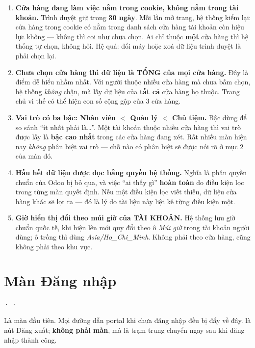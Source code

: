 \begin{enumerate}[leftmargin=*]
  \item \textbf{Cửa hàng đang làm việc nằm trong cookie, không nằm trong tài khoản.} Trình duyệt
        giữ  trong \textbf{30 ngày}. Mỗi lần mở trang, hệ thống
        kiểm lại: cửa hàng trong cookie có nằm trong danh sách cửa hàng tài khoản còn hiệu lực
        không --- không thì coi như chưa chọn. Ai chỉ thuộc \textbf{một} cửa hàng thì hệ thống
        tự chọn, không hỏi. Hệ quả: đổi máy hoặc xoá dữ liệu trình duyệt là phải chọn lại.
  \item \textbf{Chưa chọn cửa hàng thì dữ liệu là TỔNG của mọi cửa hàng.} Đây là điểm dễ hiểu
        nhầm nhất. Với người thuộc nhiều cửa hàng mà chưa bấm chọn, hệ thống \emph{không} chặn,
        mà lấy dữ liệu của \textbf{tất cả} cửa hàng họ thuộc. Trang chủ vì thế có thể hiện con
        số cộng gộp của 3 cửa hàng.
  \item \textbf{Vai trò có ba bậc: Nhân viên $<$ Quản lý $<$ Chủ tiệm.} Bậc dùng để so sánh
        ``ít nhất phải là\ldots''. Một tài khoản thuộc nhiều cửa hàng thì vai trò được lấy là
        \textbf{bậc cao nhất} trong các cửa hàng đang xét. Rất nhiều màn hiện nay \emph{không}
        phân biệt vai trò --- chỗ nào có phân biệt sẽ được nói rõ ở mục 2 của màn đó.
  \item \textbf{Hầu hết dữ liệu được đọc bằng quyền hệ thống.} Nghĩa là phân quyền chuẩn của
        Odoo bị bỏ qua, và việc ``ai thấy gì'' \textbf{hoàn toàn} do điều kiện lọc trong từng
        màn quyết định. Nếu một điều kiện lọc viết thiếu, dữ liệu cửa hàng khác sẽ lọt ra --- đó
        là lý do tài liệu này liệt kê từng điều kiện một.
  \item \textbf{Giờ hiển thị đổi theo múi giờ của TÀI KHOẢN.} Hệ thống lưu giờ chuẩn quốc tế,
        khi hiện lên mới quy đổi theo ô \emph{Múi giờ} trong tài khoản người dùng; ô trống thì
        dùng \emph{Asia/Ho\_Chi\_Minh}. Không phải theo cửa hàng, cũng không phải theo khu vực.
\end{enumerate}

\section{Màn Đăng nhập}
 ·  · 
\medskip

\mvao

Là màn đầu tiên. Mọi đường dẫn portal khi chưa đăng nhập đều bị đẩy về đây.
 là nút Đăng xuất;  \textbf{không phải màn}, mà là
trạm trung chuyển ngay sau khi đăng nhập thành công.

